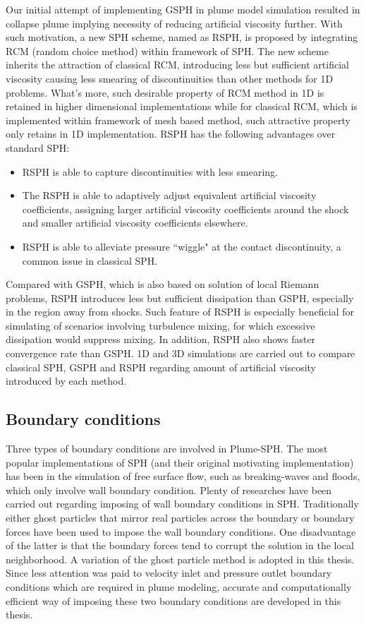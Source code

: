 Our initial attempt of implementing GSPH in plume model simulation resulted in collapse plume implying necessity of reducing artificial viscosity further. With such motivation, a new SPH scheme, named as RSPH, is proposed by integrating RCM (random choice method) within framework of SPH. 
The new scheme inherits the attraction of classical RCM, introducing less but sufficient artificial viscosity causing less smearing of discontinuities than other methods for 1D problems. What's more, such desirable property of RCM method in 1D is retained in higher dimensional implementations while for classical RCM, which is implemented within framework of mesh based method, such attractive property only retains in 1D implementation. 
RSPH has the following advantages over standard SPH:
\begin{itemize}
\item RSPH is able to capture discontinuities with less smearing.
\item The RSPH is able to adaptively adjust equivalent artificial viscosity coefficients, assigning larger artificial viscosity coefficients around the shock and smaller artificial viscosity coefficients elsewhere.
\item RSPH is able to alleviate pressure ``wiggle" at the contact discontinuity, a common issue in classical SPH.
\end{itemize}
Compared with GSPH, which is also based on solution of local Riemann problems, RSPH introduces less but sufficient dissipation than GSPH, especially in the region away from shocks. Such feature of RSPH is especially beneficial for simulating of scenarios involving turbulence mixing, for which excessive dissipation would suppress mixing. In addition, RSPH also shows faster convergence rate than GSPH. 1D and 3D simulations are carried out to compare classical SPH, GSPH and RSPH regarding amount of artificial viscosity introduced by each method.

\subsection{Boundary conditions}
Three types of boundary conditions are involved in Plume-SPH. The most popular implementations of SPH (and their original motivating implementation) has been in the simulation of free surface flow, such as breaking-waves and floods, which only involve wall boundary condition. Plenty of researches have been carried out regarding imposing of wall boundary conditions in SPH. Traditionally either ghost particles that mirror real particles across the boundary \citep {ferrari2009new} or boundary forces \citep {monaghan2009sph} have been used to impose the wall boundary conditions. One disadvantage of the latter  is that the boundary forces tend to corrupt the solution in the local neighborhood. A variation \citep {kumar2013parallel} of the ghost particle method is adopted in this thesis. Since less attention was paid to velocity inlet and pressure outlet boundary conditions which are required in plume modeling, accurate and computationally efficient way of imposing these two boundary conditions are developed in this thesis.

